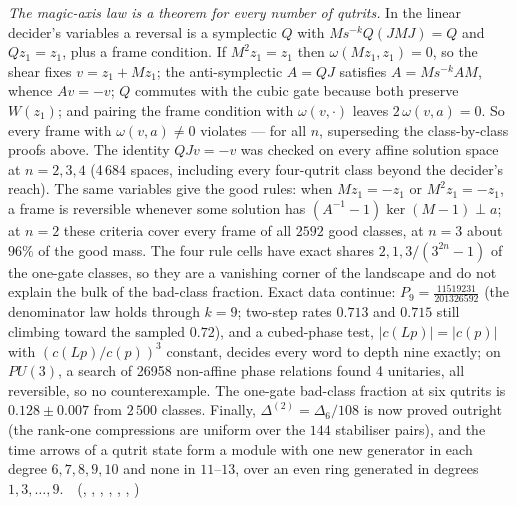 \emph{The magic-axis law is a theorem for every number of qutrits.} In the linear decider's variables a reversal is a
symplectic $Q$ with $Ms^{-k}Q(JMJ)=Q$ and $Qz_1=z_1$, plus a frame condition. If $M^2z_1=z_1$ then $\omega(Mz_1,z_1)=0$, so the
shear fixes $v=z_1+Mz_1$; the anti-symplectic $A=QJ$ satisfies $A=Ms^{-k}AM$, whence $Av=-v$; $Q$ commutes with the cubic gate
because both preserve $W(z_1)$; and pairing the frame condition with $\omega(v,\cdot)$ leaves $2\,\omega(v,a)=0$. So every frame with
$\omega(v,a)\neq0$ violates --- for all $n$, superseding the class-by-class proofs above. The identity $QJv=-v$ was checked on
every affine solution space at $n=2,3,4$ (4\,684 spaces, including every four-qutrit class beyond the decider's reach). The same
variables give the good rules: when $Mz_1=-z_1$ or $M^2z_1=-z_1$, a frame is reversible whenever some solution has
$(A^{-1}-1)\ker(M-1)\perp a$; at $n=2$ these criteria cover every frame of all $2592$ good classes, at $n=3$ about $96\%$ of
the good mass. The four rule cells have exact shares $2,1,3/(3^{2n}-1)$ of the one-gate classes, so they are a vanishing corner of
the landscape and do not explain the bulk of the bad-class fraction. Exact data continue: $P_9=\tfrac{11519231}{201326592}$ (the denominator law holds
through $k=9$; two-step rates $0.713$ and $0.715$ still climbing toward the sampled $0.72$), and a cubed-phase test,
$|c(Lp)|=|c(p)|$ with $(c(Lp)/c(p))^3$ constant, decides every word to depth nine exactly; on $PU(3)$, a search of 26958 non-affine phase relations found 4 unitaries, all reversible, so no counterexample. The one-gate bad-class
fraction at six qutrits is $0.128\pm 0.007$ from $2\,500$ classes. Finally, $\Delta^{(2)}=\Delta_6/108$ is now proved outright
(the rank-one compressions are uniform over the $144$ stabiliser pairs), and the time arrows of a qutrit state form a module with
one new generator in each degree $6,7,8,9,10$ and none in $11$--$13$, over an even ring generated in degrees $1,3,\dots,9$.
\tierT\,\tierC\ (, ,
, ,
, , )

